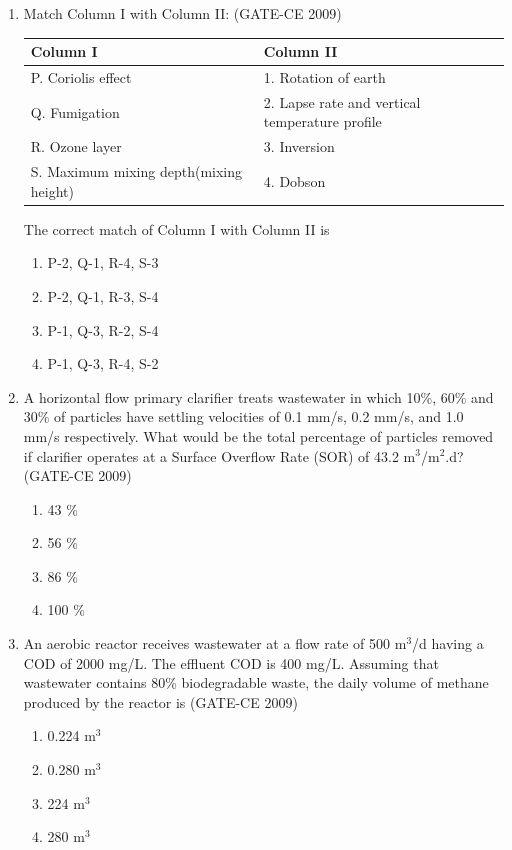 \documentclass[journal,12pt,onecolumn]{article}
\theoremstyle{remark}
\begin{document}
\begin{enumerate}
    \item Match Column I with Column II: (GATE-CE 2009)
    \begin{center}
    \begin{tabular}{|l|l|}
    \hline
    \textbf{Column I} & \textbf{Column II} \\
    \hline
    P. Coriolis effect & 1. Rotation of earth \\
    Q. Fumigation & 2. Lapse rate and vertical temperature profile \\
    R. Ozone layer & 3. Inversion \\
    S. Maximum mixing depth(mixing height) & 4. Dobson \\
    \hline
    \end{tabular}
    \end{center}
    The correct match of Column I with Column II is
    \begin{enumerate}
        \item P-2, Q-1, R-4, S-3 
        \item P-2, Q-1, R-3, S-4 
        \item P-1, Q-3, R-2, S-4 
        \item P-1, Q-3, R-4, S-2
    \end{enumerate}
    
    \item A horizontal flow primary clarifier treats wastewater in which 10\%, 60\% and 30\% of particles have settling velocities of 0.1 mm/s, 0.2 mm/s, and 1.0 mm/s respectively. What would be the total percentage of particles removed if clarifier operates at a Surface Overflow Rate (SOR) of 43.2 m$^3$/m$^2$.d? (GATE-CE 2009)
   \begin{multicols}{4}
    \begin{enumerate}
        \item 43 \% 
        \item 56 \% 
        \item 86 \% 
        \item 100 \%
    \end{enumerate}
\end{multicols}
    
    \item An aerobic reactor receives wastewater at a flow rate of 500 m$^3$/d having a COD of 2000 mg/L. The effluent COD is 400 mg/L. Assuming that wastewater contains 80\% biodegradable waste, the daily volume of methane produced by the reactor is (GATE-CE 2009)
    \begin{multicols}{2}
    \begin{enumerate}
        \item 0.224 m$^3$ 
        \item 0.280 m$^3$ 
        \item 224 m$^3$ 
        \item 280 m$^3$
    \end{enumerate}
\end{multicols}
    

\end{enumerate}
\end{document}
